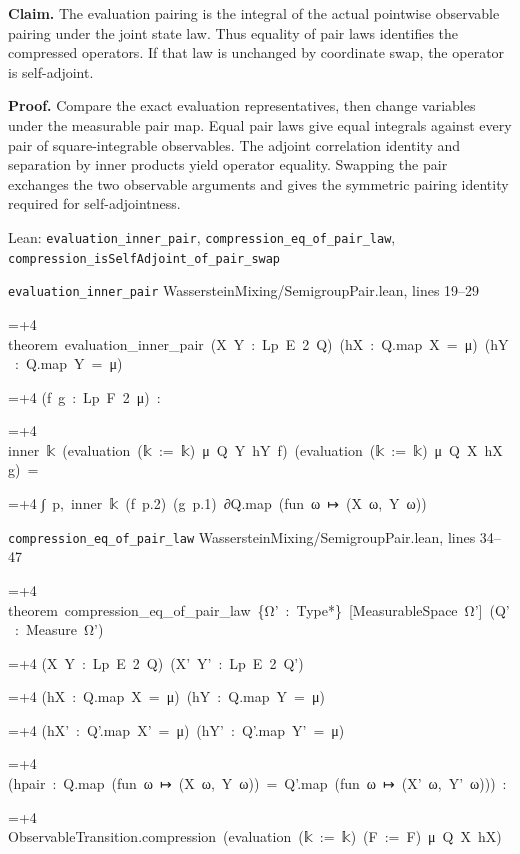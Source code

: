 \documentclass[11pt,a4paper]{report}
\newlength{\leancharwidth}
\newenvironment{leancode}{\par\smallskip\begingroup\ttfamily\footnotesize\raggedright
  \settowidth{\leancharwidth}{M}\setlength{\parskip}{0pt}\setlength{\parindent}{0pt}
  \frenchspacing}{\par\endgroup\smallskip}
\newcommand{\leanline}[2]{\hangindent=\dimexpr#1\leancharwidth+4\leancharwidth\relax
  \hangafter=1\noindent\hspace*{#1\leancharwidth}#2\par}
\newcommand{\leansource}[1]{\par{\footnotesize\color{leanmuted}#1}\par}
\begin{document}
\textbf{Claim.} The evaluation pairing is the integral of the actual pointwise observable pairing under the joint state law. Thus equality of pair laws identifies the compressed operators. If that law is unchanged by coordinate swap, the operator is self-adjoint.



\textbf{Proof.} Compare the exact evaluation representatives, then change variables under the measurable pair map. Equal pair laws give equal integrals against every pair of square-integrable observables. The adjoint correlation identity and separation by inner products yield operator equality. Swapping the pair exchanges the two observable arguments and gives the symmetric pairing identity required for self-adjointness.

\begin{leanbox}{Lean: \texttt{evaluation\_\allowbreak{}inner\_\allowbreak{}pair}, \texttt{compression\_\allowbreak{}eq\_\allowbreak{}of\_\allowbreak{}pair\_\allowbreak{}law}, \texttt{compression\_\allowbreak{}isSelfAdjoint\_\allowbreak{}of\_\allowbreak{}pair\_\allowbreak{}swap}}
\leansource{\texttt{evaluation\_\allowbreak{}inner\_\allowbreak{}pair} \quad WassersteinMixing/\allowbreak{}SemigroupPair.lean, lines 19–29}
\begin{leancode}
\leanline{0}{theorem\ evaluation\_inner\_pair\ (X\ Y\ :\ Lp\ E\ 2\ Q)\ (hX\ :\ Q.map\ X\ =\ μ)\ (hY\ :\ Q.map\ Y\ =\ μ)}
\leanline{4}{(f\ g\ :\ Lp\ F\ 2\ μ)\ :}
\leanline{4}{inner\ {\leanfallback 𝕜}\ (evaluation\ ({\leanfallback 𝕜}\ :=\ {\leanfallback 𝕜})\ μ\ Q\ Y\ hY\ f)\ (evaluation\ ({\leanfallback 𝕜}\ :=\ {\leanfallback 𝕜})\ μ\ Q\ X\ hX\ g)\ =}
\leanline{6}{∫\ p,\ inner\ {\leanfallback 𝕜}\ (f\ p.2)\ (g\ p.1)\ ∂Q.map\ (fun\ ω\ ↦\ (X\ ω,\ Y\ ω))}
\end{leancode}
\leansource{\texttt{compression\_\allowbreak{}eq\_\allowbreak{}of\_\allowbreak{}pair\_\allowbreak{}law} \quad WassersteinMixing/\allowbreak{}SemigroupPair.lean, lines 34–47}
\begin{leancode}
\leanline{0}{theorem\ compression\_eq\_of\_pair\_law\ \{Ω'\ :\ Type*\}\ [MeasurableSpace\ Ω']\ (Q'\ :\ Measure\ Ω')}
\leanline{4}{(X\ Y\ :\ Lp\ E\ 2\ Q)\ (X'\ Y'\ :\ Lp\ E\ 2\ Q')}
\leanline{4}{(hX\ :\ Q.map\ X\ =\ μ)\ (hY\ :\ Q.map\ Y\ =\ μ)}
\leanline{4}{(hX'\ :\ Q'.map\ X'\ =\ μ)\ (hY'\ :\ Q'.map\ Y'\ =\ μ)}
\leanline{4}{(hpair\ :\ Q.map\ (fun\ ω\ ↦\ (X\ ω,\ Y\ ω))\ =\ Q'.map\ (fun\ ω\ ↦\ (X'\ ω,\ Y'\ ω)))\ :}
\leanline{4}{ObservableTransition.compression\ (evaluation\ ({\leanfallback 𝕜}\ :=\ {\leanfallback 𝕜})\ (F\ :=\ F)\ μ\ Q\ X\ hX)}

\end{leancode}
\end{leanbox}
\end{document}
